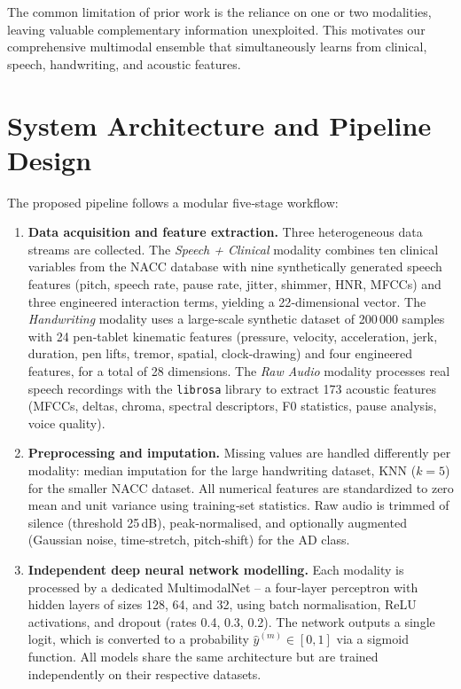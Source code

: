 \documentclass[conference]{IEEEtran}
\begin{document}
The common limitation of prior work is the reliance on one or two modalities, leaving valuable complementary information unexploited. This motivates our comprehensive multimodal ensemble that simultaneously learns from clinical, speech, handwriting, and acoustic features.

\section{System Architecture and Pipeline Design}
The proposed pipeline follows a modular five‑stage workflow:

\begin{enumerate}[leftmargin=*, itemsep=3pt]
  \item \textbf{Data acquisition and feature extraction.} Three heterogeneous data streams are collected. The \emph{Speech + Clinical} modality combines ten clinical variables from the NACC database with nine synthetically generated speech features (pitch, speech rate, pause rate, jitter, shimmer, HNR, MFCCs) and three engineered interaction terms, yielding a 22‑dimensional vector. The \emph{Handwriting} modality uses a large‑scale synthetic dataset of 200\,000 samples with 24 pen‑tablet kinematic features (pressure, velocity, acceleration, jerk, duration, pen lifts, tremor, spatial, clock‑drawing) and four engineered features, for a total of 28 dimensions. The \emph{Raw Audio} modality processes real speech recordings with the \texttt{librosa} library to extract 173 acoustic features (MFCCs, deltas, chroma, spectral descriptors, F0 statistics, pause analysis, voice quality).
  \item \textbf{Preprocessing and imputation.} Missing values are handled differently per modality: median imputation for the large handwriting dataset, KNN ($k=5$) for the smaller NACC dataset. All numerical features are standardized to zero mean and unit variance using training‑set statistics. Raw audio is trimmed of silence (threshold 25 dB), peak‑normalised, and optionally augmented (Gaussian noise, time‑stretch, pitch‑shift) for the AD class.
  \item \textbf{Independent deep neural network modelling.} Each modality is processed by a dedicated MultimodalNet – a four‑layer perceptron with hidden layers of sizes 128, 64, and 32, using batch normalisation, ReLU activations, and dropout (rates 0.4, 0.3, 0.2). The network outputs a single logit, which is converted to a probability $\hat{y}^{(m)} \in [0,1]$ via a sigmoid function. All models share the same architecture but are trained independently on their respective datasets.

\end{enumerate}
\end{document}
